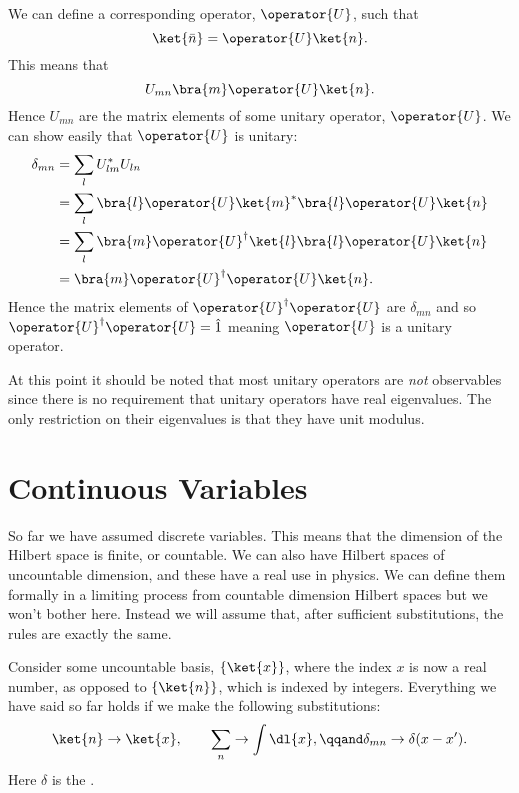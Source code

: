 \documentclass[fleqn]{NotesClass}
\newcommand*{\idop}{\hat{1}}
\newcommand*{\hermit}{\dagger}
\begin{document}
    We can define a corresponding operator, \(\operator{U}\), such that
    \begin{equation}
        \ket{\bar{n}} = \operator{U}\ket{n}.
    \end{equation}
    This means that
    \begin{equation}
        U_{mn} \bra{m}\operator{U}\ket{n}.
    \end{equation}
    Hence \(U_{mn}\) are the matrix elements of some unitary operator, \(\operator{U}\).
    We can show easily that \(\operator{U}\) is unitary:
    \begin{align}
        \delta_{mn} &= \sum_{l}U_{lm}^*U_{ln}\\
        &= \sum_l \bra{l}\operator{U}\ket{m}^*\bra{l}\operator{U}\ket{n}\\
        &= \sum_l \bra{m}\operator{U}^\hermit\ket{l}\bra{l}\operator{U}\ket{n}\\
        &= \bra{m}\operator{U}^\hermit \operator{U} \ket{n}.
    \end{align}
    Hence the matrix elements of \(\operator{U}^\hermit \operator{U}\) are \(\delta_{mn}\) and so \(\operator{U}^\hermit \operator{U} = \idop\) meaning \(\operator{U}\) is a unitary operator.
    
    At this point it should be noted that most unitary operators are \emph{not} observables since there is no requirement that unitary operators have real eigenvalues.
    The only restriction on their eigenvalues is that they have unit modulus.
    
    \section{Continuous Variables}
    So far we have assumed discrete variables.
    This means that the dimension of the Hilbert space is finite, or countable.
    We can also have Hilbert spaces of uncountable dimension, and these have a real use in physics.
    We can define them formally in a limiting process from countable dimension Hilbert spaces but we won't bother here.
    Instead we will assume that, after sufficient substitutions, the rules are exactly the same.
    
    Consider some uncountable basis, \(\{\ket{x}\}\), where the index \(x\) is now a real number, as opposed to \(\{\ket{n}\}\), which is indexed by integers.
    Everything we have said so far holds if we make the following substitutions:
    \begin{equation}
        \ket{n} \to \ket{x}, \qquad \sum_n \to\int\dl{x}, \qqand \delta_{mn} \to \delta(x - x').
    \end{equation}
    Here \(\delta\) is the .
    
\end{document}
